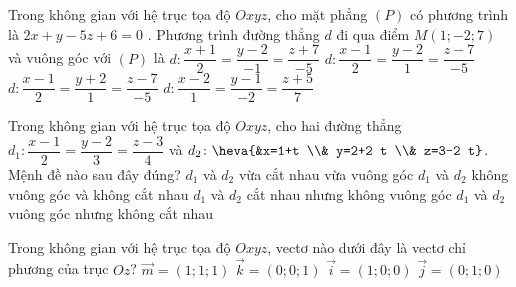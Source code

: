 \begin{ex}%
	Trong không gian với hệ trục tọa độ $O x y z$, cho mặt phẳng $(P)$ có phương trình là $2 x+y-5 z+6=0$ . Phương trình đường thẳng $d$ đi qua điểm $M(1 ;-2 ; 7)$ và  vuông góc với $(P)$ là
	\choice
	{$d\colon  \dfrac{x+1}{2}=\dfrac{y-2}{-1}=\dfrac{z+7}{-5}$}
	{$d\colon  \dfrac{x-1}{2}=\dfrac{y-2}{1}=\dfrac{z-7}{-5}$}
	{\True $d\colon  \dfrac{x-1}{2}=\dfrac{y+2}{1}=\dfrac{z-7}{-5}$}
	{$d\colon  \dfrac{x-2}{1}=\dfrac{y-1}{-2}=\dfrac{z+5}{7}$}
\end{ex}

\begin{ex}%
	Trong không gian với hệ trục tọa độ $O x y z$, cho hai đường thẳng $d_1\colon \dfrac{x-1}{2}=\dfrac{y-2}{3}=\dfrac{z-3}{4}$ và $d_2\colon\heva{&x=1+t \\& y=2+2 t \\& z=3-2 t}$. Mệnh đề nào sau đây đúng?
	\choice
	{\True $d_1$ và $d_2$  vừa cắt nhau vừa vuông góc}
	{$d_1$ và $d_2$ không vuông góc và không cắt nhau}
	{$d_1$ và $d_2$ cắt nhau nhưng không vuông góc}
	{$d_1$ và $d_2$ vuông góc nhưng không cắt nhau}
\end{ex}

\begin{ex}%
	Trong không gian với hệ trục tọa độ $Oxyz$, vectơ nào dưới đây là vectơ chỉ phương của trục $Oz$?
	\choice
	{$\overrightarrow{m}=(1 ; 1 ; 1)$}
	{\True $\overrightarrow{k}=(0 ; 0 ; 1)$}
	{$\overrightarrow{i}=(1 ; 0 ; 0)$}
	{$\overrightarrow{j}=(0 ; 1 ; 0)$}
\end{ex}

